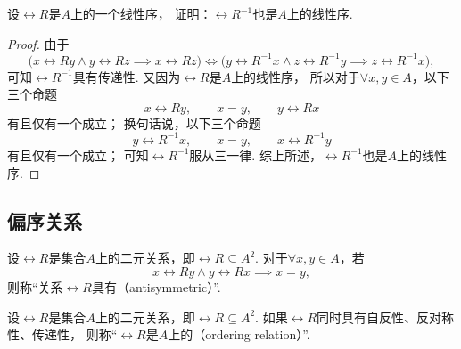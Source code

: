 \begin{example}
设\(\rel{R}\)是\(A\)上的一个线性序，
证明：\(\rel{R}^{-1}\)也是\(A\)上的线性序.
\begin{proof}
由于\[
	\bigl( x \rel{R} y \land y \rel{R} z \implies x \rel{R} z \bigr)
	\iff
	\bigl( y \rel{R}^{-1} x \land z \rel{R}^{-1} y \implies z \rel{R}^{-1} x \bigr),
\]
可知\(\rel{R}^{-1}\)具有传递性.
又因为\(\rel{R}\)是\(A\)上的线性序，
所以对于\(\forall x,y \in A\)，以下三个命题\[
	x \rel{R} y, \qquad
	x = y, \qquad
	y \rel{R} x
\]有且仅有一个成立；
换句话说，以下三个命题\[
	y \rel{R}^{-1} x, \qquad
	x = y, \qquad
	x \rel{R}^{-1} y
\]有且仅有一个成立；
可知\(\rel{R}^{-1}\)服从三一律.
综上所述，\(\rel{R}^{-1}\)也是\(A\)上的线性序.
\end{proof}
\end{example}

\subsection{偏序关系}
\begin{definition}
设\(\rel{R}\)是集合\(A\)上的二元关系，即\(\rel{R} \subseteq A^2\).
对于\(\forall x,y \in A\)，若\[
	x\rel{R}y \land y\rel{R}x \implies x = y,
\]
则称“关系\(\rel{R}\)具有（antisymmetric）”.
\end{definition}

\begin{definition}
设\(\rel{R}\)是集合\(A\)上的二元关系，即\(\rel{R} \subseteq A^2\).
如果\(\rel{R}\)同时具有自反性、反对称性、传递性，
则称“\(\rel{R}\)是\(A\)上的（ordering relation）”.
\end{definition}

%
%
%
